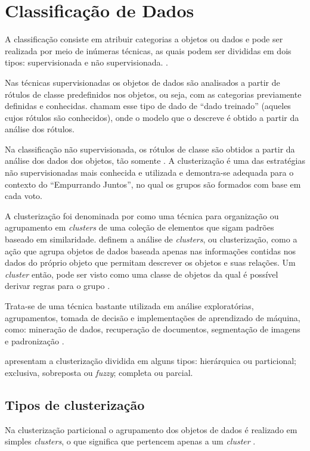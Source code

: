 \chapter{Classificação de Dados} \label{cap:classificação}

A classificação consiste em atribuir categorias a objetos ou dados e pode ser realizada por meio de inúmeras técnicas, as quais podem
ser divididas em dois tipos: supervisionada e não supervisionada. \cite{tan2013data, han2011data, clustering_review}.

Nas técnicas supervisionadas os objetos de dados são analisados a partir de rótulos de classe predefinidos nos objetos, ou seja, 
com as categorias previamente definidas e conhecidas.  chamam esse tipo de dado de ``dado treinado''
(aqueles cujos rótulos são conhecidos), onde o modelo que o descreve é obtido a partir da análise dos rótulos.

Na classificação não supervisionada, os rótulos de classe são obtidos a partir da análise dos dados dos objetos, tão somente \cite{tan2013data}.
A clusterização é uma das estratégias não supervisionadas mais conhecida e utilizada e demontra-se adequada para o contexto
do ``Empurrando Juntos'', no qual os grupos são formados com base em cada voto.

A clusterização foi denominada por  como uma técnica para organização ou agrupamento em \textit{clusters} 
de uma coleção de elementos que sigam padrões baseado em similaridade.
 definem a análise de \textit{clusters}, ou clusterização, como a ação que agrupa objetos de dados
baseada apenas nas informações contidas nos dados do próprio objeto que permitam descrever os objetos e suas relações. Um \textit{cluster}
então, pode ser visto como uma classe de objetos da qual é possível derivar regras para o grupo \cite{han2011data}.

Trata-se de uma técnica bastante utilizada em análise exploratórias, agrupamentos, 
tomada de decisão e implementações de aprendizado de máquina, como:
mineração de dados, recuperação de documentos, segmentação de imagens e padronização \cite{clustering_review}.

 apresentam a clusterização dividida em alguns tipos: 
hierárquica ou particional; exclusiva, sobreposta ou \textit{fuzzy}; completa ou parcial.

\section{Tipos de clusterização}
Na clusterização particional o agrupamento dos 
objetos de dados é realizado em simples \textit{clusters}, o que significa que pertencem apenas a um \textit{cluster} \cite{tan2013data}.

